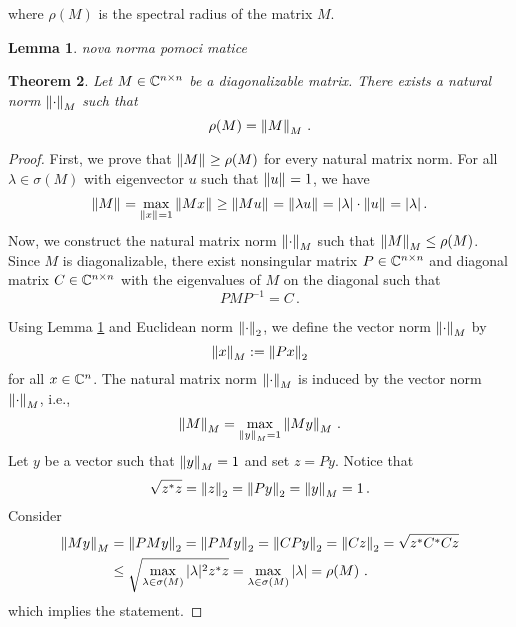 \documentclass{article}
\newtheorem{theo}{Theorem}
\newtheorem{lem}[theo]{Lemma}
\begin{document}
where $\rho(M)$ is the spectral radius of the matrix $M$.

\begin{lem}
\label{lem:vectNorm}
nova norma pomoci matice
\end{lem}


\begin{theo}
Let $M\in\mathbb{C}^{n\times n}$ be a diagonalizable matrix. There exists a natural norm $\left\lVert\cdot\right\rVert_{M}$ such that 
$$
\rho(M)=\left\lVert M\right\rVert_{M}\,.
$$
\end{theo}
\begin{proof}
First, we prove that $\left\lVert M\right\rVert_{}\geq\rho(M)$ for every natural matrix norm. For all $\lambda\in\sigma(M)$ with eigenvector $u$ such that $\left\lVert u\right\rVert_{}=1$, we have
$$
\left\lVert M\right\rVert_{}=\max_{\left\lVert x\right\rVert_{}=1} \left\lVert Mx\right\rVert_{}\geq \left\lVert Mu\right\rVert_{}=\left\lVert\lambda u\right\rVert_{}=|\lambda|\cdot\left\lVert u\right\rVert_{}=|\lambda|\,.
$$
Now, we construct the natural matrix norm $\left\lVert\cdot\right\rVert_{M}$ such that $\left\lVert M\right\rVert_{M}\leq\rho(M)$. Since $M$ is diagonalizable, there exist nonsingular matrix $P\in\mathbb{C}^{n\times n}$ and diagonal matrix $C\in\mathbb{C}^{n\times n}$ with the eigenvalues of $M$ on the diagonal such that 
$$
PMP^{-1}=C\,.
$$ 

Using Lemma \ref{lem:vectNorm} and Euclidean norm $\left\lVert\cdot\right\rVert_{2}$, we define the vector norm $\left\lVert\cdot\right\rVert_{M}$ by 
\begin{equation}
\left\lVert x\right\rVert_{M}:=\left\lVert Px\right\rVert_{2}
\end{equation}
for all $x\in\mathbb{C}^n$. The natural matrix norm $\left\lVert\cdot\right\rVert_{M}$ is induced by the vector norm $\left\lVert\cdot\right\rVert_{M}$, i.e.,
$$
\left\lVert M\right\rVert_{M}=\max_{\left\lVert y\right\rVert_{M}=1} \left\lVert My\right\rVert_{M}\,.
$$
Let $y$ be a  vector such that $\left\lVert y\right\rVert_{M}=1$ and set $z=Py$. Notice that 
$$
\sqrt{z^*z}=\left\lVert z\right\rVert_{2}=\left\lVert Py\right\rVert_{2}=\left\lVert y\right\rVert_{M}=1\,.
$$
Consider
\begin{align*}
\left\lVert My\right\rVert_{M}&=\left\lVert PMy\right\rVert_{2}=\left\lVert PMy\right\rVert_{2}=\left\lVert CPy\right\rVert_{2}=\left\lVert Cz\right\rVert_{2}=\sqrt{z^*C^*Cz}\\
    &\leq \sqrt{\max_{\lambda\in\sigma(M)}|\lambda|^2 z^*z}=\max_{\lambda\in\sigma(M)}|\lambda|=\rho(M)\,\,.
\end{align*}
which implies the statement.
\end{proof}
\end{document}
